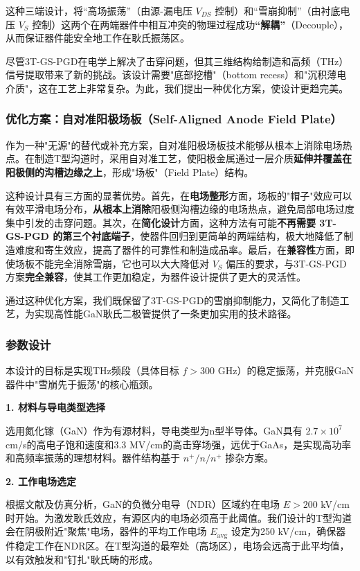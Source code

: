 \documentclass[12pt,a4paper]{article}
\begin{document}
这种三端设计，将“高场振荡”（由源-漏电压 $V_{DS}$ 控制）和“雪崩抑制”（由衬底电压 $V_S$ 控制）这两个在两端器件中相互冲突的物理过程成功\textbf{“解耦”}（Decouple），从而保证器件能安全地工作在耿氏振荡区。

尽管3T-GS-PGD在电学上解决了击穿问题，但其三维结构给制造和高频（THz）信号提取带来了新的挑战。该设计需要"底部挖槽"（bottom recess）和"沉积薄电介质"，这在工艺上非常复杂。为此，我们提出一种优化方案，使设计更趋完美。

\subsubsection{优化方案：自对准阳极场板（Self-Aligned Anode Field Plate）}

作为一种"无源"的替代或补充方案，自对准阳极场板技术能够从根本上消除电场热点。在制造T型沟道时，采用自对准工艺，使阳极金属通过一层介质\textbf{延伸并覆盖在阳极侧的沟槽边缘之上}，形成"场板"（Field Plate）结构。

这种设计具有三方面的显著优势。首先，在\textbf{电场整形}方面，场板的"帽子"效应可以有效平滑电场分布，\textbf{从根本上消除}阳极侧沟槽边缘的电场热点，避免局部电场过度集中引发的击穿问题。其次，在\textbf{简化设计}方面，这种方法有可能\textbf{不再需要 3T-GS-PGD 的第三个衬底端子}，使器件回归到更简单的两端结构，极大地降低了制造难度和寄生效应，提高了器件的可靠性和制造成品率。最后，在\textbf{兼容性}方面，即使场板不能完全消除雪崩，它也可以大大降低对 $V_S$ 偏压的要求，与3T-GS-PGD方案\textbf{完全兼容}，使其工作更加稳定，为器件设计提供了更大的灵活性。

通过这种优化方案，我们既保留了3T-GS-PGD的雪崩抑制能力，又简化了制造工艺，为实现高性能GaN耿氏二极管提供了一条更加实用的技术路径。

\subsubsection{参数设计}

本设计的目标是实现THz频段（具体目标 $f > 300$ GHz）的稳定振荡，并克服GaN器件中"雪崩先于振荡"的核心瓶颈。

\textbf{1. 材料与导电类型选择}

选用氮化镓（GaN）作为有源材料，导电类型为n型半导体。GaN具有 $2.7 \times 10^7$ cm/s的高电子饱和速度和3.3 MV/cm的高击穿场强，远优于GaAs，是实现高功率和高频率振荡的理想材料。器件结构基于 $n^+/n/n^+$ 掺杂方案。

\textbf{2. 工作电场选定}

根据文献及仿真分析，GaN的负微分电导（NDR）区域约在电场 $E > 200$ kV/cm时开始。为激发耿氏效应，有源区内的电场必须高于此阈值。我们设计的T型沟道会在阴极附近"聚焦"电场，器件的平均工作电场 $E_{\text{avg}}$ 设定为250 kV/cm，确保器件稳定工作在NDR区。在T型沟道的最窄处（高场区），电场会远高于此平均值，以有效触发和"钉扎"耿氏畴的形成。
\end{document}

